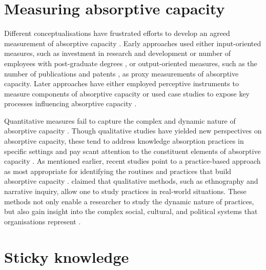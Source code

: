 \section{Measuring absorptive capacity}

Different conceptualisations have frustrated efforts to develop an agreed measurement of absorptive capacity \citep{duchek2013capturing}. Early approaches used either input-oriented measures, such as investment in research and development \citep[e.g.][]{rocha1999inter,stock2001absorptive,becker2000technological} or number of employees with post-graduate degrees \citep[e.g.][]{veugelers1997internal,gao2008knowledge}, or output-oriented measures, such as the number of publications and patents \citep[e.g.][]{cockburn1998absorptive,george2001effects}, as proxy measurements of absorptive capacity. Later approaches have either employed perceptive instruments to measure components of absorptive capacity \citep[e.g.][]{szulanski1996exploring,jansen2005managing,nieto2005absorptive,flatten2011measure} or used case studies to expose key processes influencing absorptive capacity \citep[e.g.][]{kim1998crisis,van1999coevolution,jones2001expanding,jones2006developing,easterby2008absorptive}. \medskip

Quantitative measures fail to capture the complex and dynamic nature of absorptive capacity \citep{easterby2008absorptive,duchek2013capturing}. Though qualitative studies have yielded new perspectives on absorptive capacity, these tend to address knowledge absorption practices in specific settings and pay scant attention to the constituent elements of absorptive capacity \citep{duchek2013capturing}. As mentioned earlier, recent studies point to a practice-based approach as most appropriate for identifying the routines and practices that build absorptive capacity \citep[e.g.][]{duchek2013capturing,omidvar2013revisiting,marabelli2012knowledge,marabelli2014knowing}. \citet{duchek2013capturing} claimed that qualitative methods, such as ethnography and narrative inquiry, allow one to study practices in real-world situations. These methods not only enable a researcher to study the dynamic nature of practices, but also gain insight into the complex social, cultural, and political systems that organisations represent \citep{duchek2013capturing}. \medskip

\section{Sticky knowledge}

